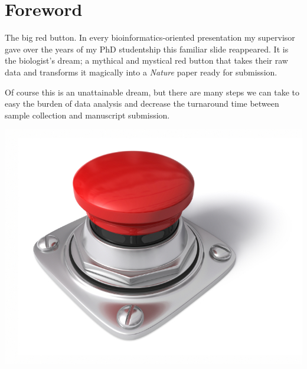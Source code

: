 \chapter*{Foreword}
\setlength\parindent{0pt}
\vspace{-1cm}
The big red button. In every bioinformatics-oriented presentation my supervisor gave over the years of my PhD studentship this familiar slide reappeared.
It is the biologist's dream; a mythical and mystical red button that takes their raw data and transforms it magically into a \emph{Nature} paper ready for submission.


Of course this is an unattainable dream, but there are many steps we can take to easy the burden of data analysis and decrease the
turnaround time between sample collection and manuscript submission.

\begin{center}
\includegraphics[scale=0.25]{chapters/images/redbutton.jpg}
\end{center}
